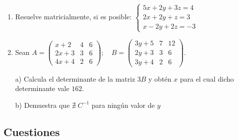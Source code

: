 \begin{enumerate}
\item Resuelve matricialmente, si es posible: $\begin{cases} 5x+2y+3z=4\\2x+2y+z=3\\x-2y+2z=-3  \end{cases}$


\rightline{\textcolor{gris}{Solución: $x=1; \; y=1; \; z=-1$.}}

\item Sean $A=\left( \begin{matrix} x+2&4&6\\2x+3&3&6\\4x+4&2&6 \end{matrix} \right); \quad B=\left( \begin{matrix} 3y+5&7&12\\2y+3&3&6\\3y+4&2&6 \end{matrix} \right)$.

a) Calcula el determinante de la matriz $3B$ y obtén $x$ para el cual dicho determinante vale $162$.

b) Demuestra que $\nexists \; C^{-1}$ para ningún valor de $y$

\rightline{\textcolor{gris}{Solución: $a)\; 3^3\cdot 6x=162 \leftrightarrow x=1; \quad b)\; |B|=0,\; \forall y \in \mathbb R$ .}}

	
\end{enumerate}







\subsection{Cuestiones}

